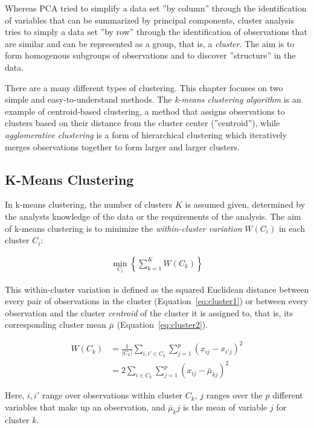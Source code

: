 Whereas PCA tried to simplify a data set ''by column'' through the identification of variables that can be summarized by principal components, cluster analysis tries to simply a data set ''by row'' through the identification of observations that are similar and can be represented as a group, that is, a \emph{cluster}. The aim is to form homogenous subgroups of observations and to discover ''structure'' in the data.

There are a many different types of clustering. This chapter focuses on two simple and easy-to-understand methods. The \emph{k-means clustering algorithm} is an example of centroid-based clustering, a method that assigns observations to clusters based on their distance from the cluster center (''centroid''), while \emph{agglomerative clustering} is a form of hierarchical clustering which iteratively merges observations together to form larger and larger clusters. 

\subsection{K-Means Clustering}

In k-means clustering, the number of clusters $K$ is assumed given, determined by the analysts knowledge of the data or the requirements of the analysis. The aim of k-means clustering is to minimize the \emph{within-cluster variation} $W(C_i)$ in each cluster $C_i$:

\begin{align*}
\min_{C_i} \left\{ \sum_{k=1}^K W(C_k) \right\}
\end{align*}

\noindent This within-cluster variation is defined as the squared Euclidean distance between every pair of observations in the cluster (Equation~\ref{eq:cluster1}) or between every observation and the cluster \emph{centroid} of the cluster it is assigned to, that is, its corresponding cluster mean $\bar{\mu}$ (Equation~\ref{eq:cluster2}).

\begin{align}
W(C_k) &= \frac{1}{|C_k|} \sum_{i,i' \in C_k} \sum_{j=1}^p (x_{ij} - x_{i'j})^2 \label{eq:cluster1} \\
&= 2 \sum_{i \in C_k} \sum_{j=1}^p (x_{ij} - \bar{\mu}_{kj})^2 \label{eq:cluster2}
\end{align}

\noindent Here, $i, i'$ range over observations within cluster $C_k$, $j$ ranges over the $p$ different variables that make up an observation, and $\bar{\mu}_kj$ is the mean of variable $j$ for cluster $k$.

